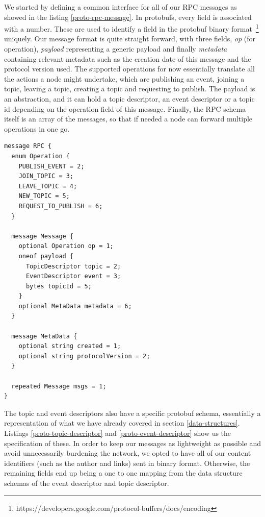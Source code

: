 We started by defining a common interface for all of our RPC messages as showed
in the listing \ref{proto-rpc-message}. In protobufs, every field is associated
with a number. These are used to identify a field in the protobuf binary
format~\footnote{https://developers.google.com/protocol-buffers/docs/encoding}
uniquely.  Our message format is quite straight forward, with three fields,
\emph{op} (for operation), \emph{payload} representing a generic payload and
finally \emph{metadata} containing relevant metadata such as the creation date
of this message and the protocol version used. The supported operations for now
essentially translate all the actions a node might undertake, which are
publishing an event, joining a topic, leaving a topic, creating a topic and
requesting to publish. The payload is an abstraction, and it can hold a topic
descriptor, an event descriptor or a topic id depending on the operation field
of this message. Finally, the RPC schema itself is an array of the messages, so
that if needed a node can forward multiple operations in one go.

\begin{lstlisting}[float, language=protobuf3,caption={Protobuf schema for our RPC messages},label={proto-rpc-message}]
message RPC {
  enum Operation {
    PUBLISH_EVENT = 2;
    JOIN_TOPIC = 3;
    LEAVE_TOPIC = 4;
    NEW_TOPIC = 5;
    REQUEST_TO_PUBLISH = 6;
  }

  message Message {
    optional Operation op = 1;
    oneof payload {
      TopicDescriptor topic = 2;
      EventDescriptor event = 3;
      bytes topicId = 5;
    }
    optional MetaData metadata = 6;
  }

  message MetaData {
    optional string created = 1;
    optional string protocolVersion = 2;
  }

  repeated Message msgs = 1;
}
\end{lstlisting}

The topic and event descriptors also have a specific protobuf schema,
essentially a representation of what we have already covered in section
\ref{data-structures}. Listings \ref{proto-topic-descriptor} and
\ref{proto-event-descriptor} show us the specification of these. In order to
keep our messages as lightweight as possible and avoid unnecessarily burdening
the network, we opted to have all of our content identifiers (such as the
author and links) sent in binary format. Otherwise, the remaining fields end up
being a one to one mapping from the data structure schemas of the event
descriptor and topic descriptor.

